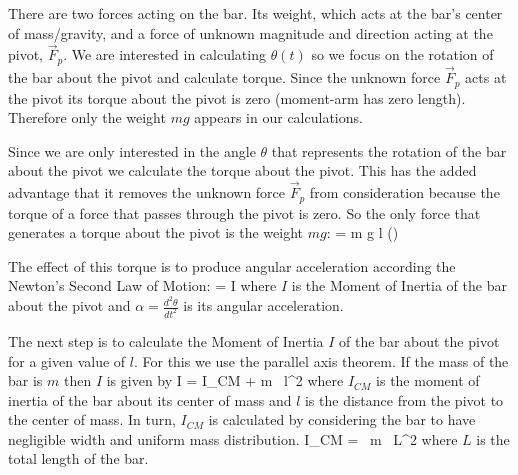    \begin{center}
      
   \end{center}

   There are two forces acting on the bar. Its weight, which acts at the bar's center of mass/gravity, and a force of unknown magnitude and direction acting at the pivot, $\vec{F}_p$. We are interested in calculating $\theta(t)$ so we focus on the rotation of the bar about the pivot and calculate torque. Since the unknown force $\vec{F}_p$ acts at the pivot its torque about the pivot is zero (moment-arm has zero length). Therefore only the weight $m g$ appears in our calculations.

   Since we are only interested in the angle $\theta$ that represents the rotation of the bar about the pivot we calculate the torque about the pivot. This has the added advantage that it removes the unknown force $\vec{F}_p$ from consideration because the torque of a force that passes through the pivot is zero. So the only force that generates a torque about the pivot is the weight $m g$:
   \beq
      \tau = m g l \sin(\theta)
   \eeq

   The effect of this torque is to produce angular acceleration according the Newton's Second Law of Motion:
   \beq
      \tau = I \alpha
   \eeq
   where $I$ is the Moment of Inertia of the bar about the pivot and $\alpha = \frac{d^2 \theta}{dt^2}$ is its angular acceleration.

   \vspace{\baselineskip} 
   The next step is to calculate the Moment of Inertia $I$ of the bar about the pivot for a given value of $l$. For this we use the parallel axis theorem. If the mass of the bar is $m$ then $I$ is given by
   \beq
      I = I_{CM} + m \, l^2
   \eeq
   where $I_{CM}$ is the moment of inertia of the bar about its center of mass and $l$ is the distance from the pivot to the center of mass. In turn, $I_{CM}$ is calculated by considering the bar to have negligible width and uniform mass distribution.
   \beq
      I_{CM} =  \, m \, L^2
   \eeq
   where $L$ is the total length of the bar.
